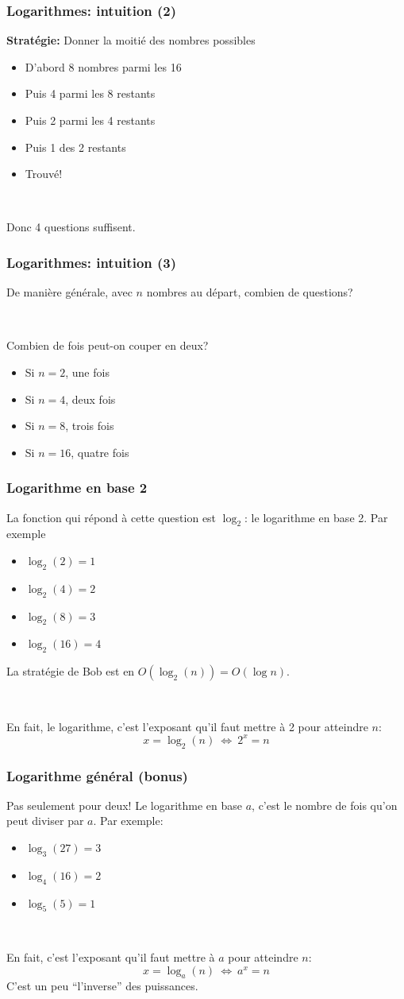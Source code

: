 \documentclass[12pt]{beamer}
\begin{document}
\begin{frame}
\frametitle{Logarithmes: intuition (2)}
\textbf{Stratégie:} Donner la moitié des nombres possibles
\begin{itemize}
\item D'abord 8 nombres parmi les 16
\item Puis 4 parmi les 8 restants
\item Puis 2 parmi les 4 restants
\item Puis 1 des 2 restants
\item Trouvé!
\end{itemize}

~

Donc 4 questions suffisent.
\end{frame}

\begin{frame}
\frametitle{Logarithmes: intuition (3)}
De manière générale, avec $n$ nombres au départ, combien de questions?

~

Combien de fois peut-on couper en deux?
\begin{itemize}
\item Si $n=2$, une fois
\item Si $n=4$, deux fois
\item Si $n=8$, trois fois
\item Si $n=16$, quatre fois
\end{itemize}
\end{frame}

\begin{frame}
\frametitle{Logarithme en base 2}
La fonction qui répond à cette question est $\log_2$: le logarithme en base 2. Par exemple
\begin{itemize}
\item $\log_2 (2) = 1$
\item $\log_2 (4) = 2$
\item $\log_2 (8) = 3$
\item $\log_2 (16) = 4$
\end{itemize}
La stratégie de Bob est en $O(\log_2(n)) = O(\log n)$.

~

En fait, le logarithme, c'est l'exposant qu'il faut mettre à 2 pour atteindre $n$:
\[ x = \log_2 (n)\ \Leftrightarrow\ 2^x = n \]
\end{frame}

\begin{frame}
\frametitle{Logarithme général (bonus)}
Pas seulement pour deux! Le logarithme en base $a$, c'est le nombre de fois qu'on peut diviser par $a$. Par exemple:
\begin{itemize}
\item $\log_3(27) = 3$
\item $\log_4(16) = 2$
\item $\log_5(5) = 1$
\end{itemize}

~

En fait, c'est l'exposant qu'il faut mettre à $a$ pour atteindre $n$:
\[ x = \log_a (n)\ \Leftrightarrow\ a^x = n \]
C'est un peu ``l'inverse'' des puissances.
\end{frame}
\end{document}
